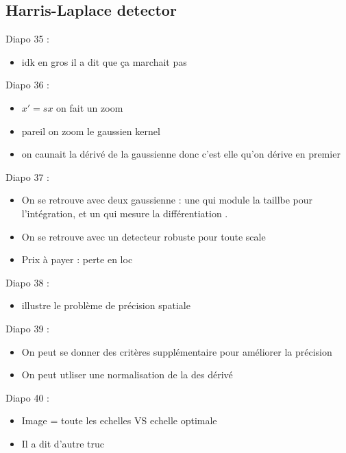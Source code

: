 \documentclass{article}
\theoremstyle{plain}%
\theoremstyle{definition}
\theoremstyle{remark}
\begin{document}
\subsection{Harris-Laplace detector}
Diapo 35 : 
\begin{itemize}
    \item idk en gros il a dit que ça marchait pas 
\end{itemize}
Diapo 36 : 
\begin{itemize}
    \item $ x' = sx$ on fait un zoom
    \item pareil on zoom le gaussien kernel
    \item on caunait la dérivé de la gaussienne donc c'est elle qu'on dérive en premier 
\end{itemize}
Diapo 37 : 
\begin{itemize}
    \item On se retrouve avec deux gaussienne : une qui module la taillbe pour l'intégration, et un qui mesure la différentiation .
    \item On se retrouve avec un detecteur robuste pour toute scale
    \item Prix à payer : perte en loc
\end{itemize}
Diapo 38 : 
\begin{itemize}
    \item illustre le problème de précision spatiale
\end{itemize}
Diapo 39 : 
\begin{itemize}
    \item On peut se donner des critères supplémentaire pour améliorer la précision 
    \item On peut utliser une normalisation de la des dérivé 
\end{itemize}
Diapo 40 : 
\begin{itemize}
    \item Image  = toute les echelles VS echelle optimale
    \item Il a dit d'autre truc
\end{itemize}
\end{document}

